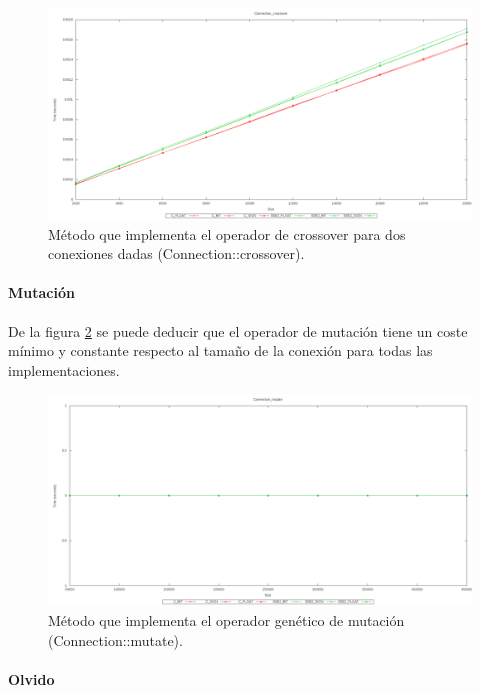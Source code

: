 \documentclass[11pt]{article}
\begin{document}
\begin{titlepage}
\begin{figure}[htb]
\centering
\includegraphics[width=\textwidth]{./img/Connection_crossover.png}
\caption{\label{grafImplCrossover}Método que implementa el operador de crossover para dos conexiones dadas (Connection::crossover).}
\end{figure}
\newpage
\paragraph{Mutación}
\label{sec-6-1-1-5}


De la figura \ref{grafImplMutation} se puede deducir que el operador de mutación tiene un coste mínimo y constante respecto al tamaño de la conexión para todas las implementaciones.

\begin{figure}[htb]
\centering
\includegraphics[width=\textwidth]{./img/Connection_mutate.png}
\caption{\label{grafImplMutation}Método que implementa el operador genético de mutación (Connection::mutate).}
\end{figure}
\newpage
\paragraph{Olvido}
\label{sec-6-1-1-6}



\end{titlepage}
\end{document}
